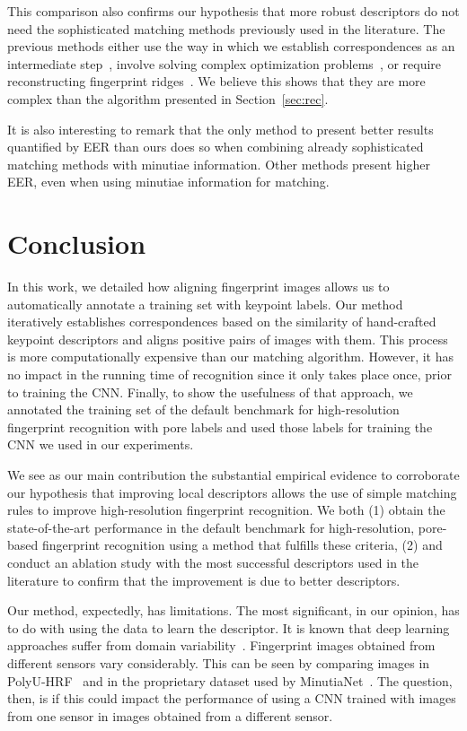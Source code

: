 \documentclass[10pt,twocolumn,letterpaper]{article}
\begin{document}
This comparison also confirms our hypothesis that more robust descriptors do not need the sophisticated matching methods previously used in the literature.
The previous methods either use the way in which we establish correspondences as an intermediate step~\cite{direct-pore, td-sparse, feature-guided}, involve solving complex optimization problems~\cite{td-sparse, feature-guided, su-pores-deep}, or require reconstructing fingerprint ridges~\cite{ridge-reconstruction}.
We believe this shows that they are more complex than the algorithm presented in Section~\ref{sec:rec}.

It is also interesting to remark that the only method to present better results quantified by EER than ours does so when combining already sophisticated matching methods with minutiae information.
Other methods present higher EER, even when using minutiae information for matching.

\section{Conclusion}

In this work, we detailed how aligning fingerprint images allows us to automatically annotate a training set with keypoint labels.
Our method iteratively establishes correspondences based on the similarity of hand-crafted keypoint descriptors and aligns positive pairs of images with them.
This process is more computationally expensive than our matching algorithm.
However, it has no impact in the running time of recognition since it only takes place once, prior to training the CNN.
Finally, to show the usefulness of that approach, we annotated the training set of the default benchmark for high-resolution fingerprint recognition with pore labels and used those labels for training the CNN we used in our experiments.

We see as our main contribution the substantial empirical evidence to corroborate our hypothesis that improving local descriptors allows the use of simple matching rules to improve high-resolution fingerprint recognition.
We both (1) obtain the state-of-the-art performance in the default benchmark for high-resolution, pore-based fingerprint recognition using a method that fulfills these criteria, (2) and conduct an ablation study with the most successful descriptors used in the literature to confirm that the improvement is due to better descriptors.


Our method, expectedly, has limitations.
The most significant, in our opinion, has to do with using the data to learn the descriptor.
It is known that deep learning approaches suffer from domain variability~\cite{domain-gan}.
Fingerprint images obtained from different sensors vary considerably.
This can be seen by comparing images in PolyU-HRF~\cite{direct-pore} and in the proprietary dataset used by MinutiaNet~\cite{zhang-pattern-rec}.
The question, then, is if this could impact the performance of using a CNN trained with images from one sensor in images obtained from a different sensor.
\end{document}
